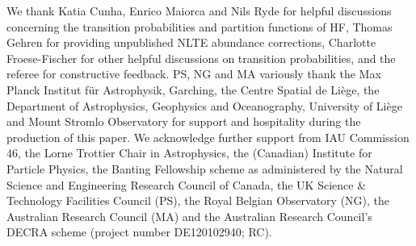 \documentclass[traditabstract]{aa}
\begin{document}
\begin{acknowledgements}
We thank Katia Cunha, Enrico Maiorca and Nils Ryde for helpful discussions concerning the transition probabilities and partition functions of HF, Thomas Gehren for providing unpublished NLTE abundance corrections, Charlotte Froese-Fischer for other helpful discussions on transition probabilities, and the referee for constructive feedback. PS, NG and MA variously thank the Max Planck Institut f\"ur Astrophysik, Garching, the Centre Spatial de Li\`ege, the Department of Astrophysics, Geophysics and Oceanography, University of Li\`ege and Mount Stromlo Observatory for support and hospitality during the production of this paper.  We acknowledge further support from IAU Commission 46, the Lorne Trottier Chair in Astrophysics, the (Canadian) Institute for Particle Physics, the Banting Fellowship scheme as administered by the Natural Science and Engineering Research Council of Canada, the UK Science \& Technology Facilities Council (PS), the Royal Belgian Observatory (NG), the Australian Research Council (MA) and the Australian Research Council's DECRA scheme (project number DE120102940; RC).
\end{acknowledgements}

\setcounter{table}{0}
\end{document}
